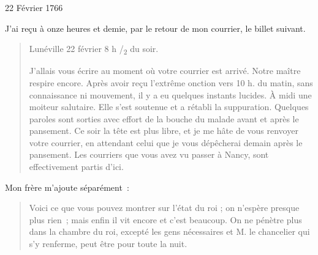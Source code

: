 \begin{diary}{22 Février 1766}{}
        
                         J'ai reçu à onze heures et demie, par le
                           retour de mon courrier, le billet suivant. \bigskip
        
        
                        \begin{quote}\begin{flushright}Lunéville
                              22 février 8 h /\textsubscript{2} du
                                 soir.\end{flushright}
                              J'allais vous écrire au moment où votre
                              courrier est arrivé. Notre maître
                                 respire encore. Après avoir
                                 reçu l'extrême
                                 onction vers 10 h. du
                                    matin, sans connaissance
                                 ni mouvement, il y a eu quelques instants
                                 lucides. À midi une moiteur salutaire.
                                 Elle
                                 s'est soutenue et a rétabli la suppuration.
                                 Quelques paroles sont sorties avec effort de la
                                 bouche du malade avant et après le pansement.
                              Ce soir la tête est plus libre, et je me hâte
                              de vous renvoyer votre courrier, en attendant
                              celui que je vous dépêcherai demain après
                              le pansement. Les courriers que vous avez
                              vu passer à Nancy, sont
                              effectivement partis d'ici. \bigskip
        
        \end{quote}
                        
                           Mon frère m'ajoute séparément : \bigskip
        
        
                        \begin{quote}\begin{flushright}\end{flushright}
                              Voici ce que vous pouvez montrer sur l'état
                              du roi ; on n'espère
                              presque plus rien ; mais
                              enfin il vit encore et c'est beaucoup. On ne
                              pénètre plus dans la chambre du roi, excepté
                              les gens nécessaires et M. le
                                 chancelier qui
                              s'y renferme, peut être pour toute la nuit. \bigskip
        

\end{quote}
\end{diary}
